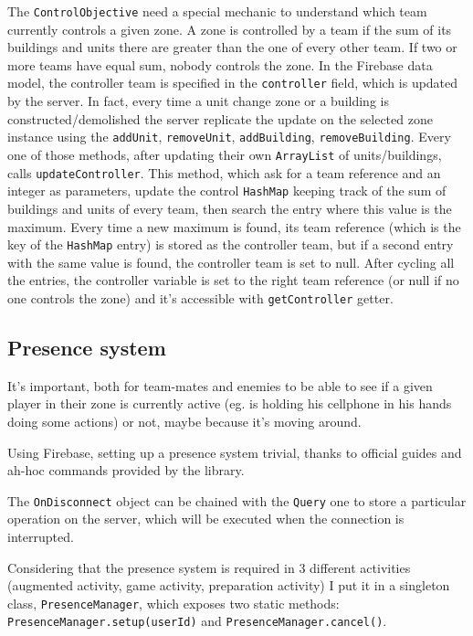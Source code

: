 			The \lstinline|ControlObjective| need a special mechanic to understand which team currently controls a given zone.
			A zone is controlled by a team if the sum of its buildings and units there are greater than the one of every other team.
			If two or more teams have equal sum, nobody controls the zone.
			In the Firebase data model, the controller team is specified in the \lstinline|controller| field, which is updated by the server.
			In fact, every time a unit change zone or a building is constructed/demolished the server replicate the update on the selected zone instance using the \lstinline|addUnit|, \lstinline|removeUnit|, \lstinline|addBuilding|, \lstinline|removeBuilding|.
			Every one of those methods, after updating their own \lstinline|ArrayList| of units/buildings, calls \lstinline|updateController|.
			This method, which ask for a team reference and an integer as parameters, update the control \lstinline|HashMap| keeping track of the sum of buildings and units of every team, then search the entry where this value is the maximum.
			Every time a new maximum is found, its team reference (which is the key of the \lstinline|HashMap| entry) is stored as the controller team, but if a second entry with the same value is found, the controller team is set to null.
			After cycling all the entries, the controller variable is set to the right team reference (or null if no one controls the zone) and it's accessible with \lstinline|getController| getter.
		
		\subsection{Presence system}\label{focus:presence}

			It's important, both for team-mates and enemies to be able to see if a given player in their zone is currently active (eg. is holding his cellphone in his hands doing some actions) or not, maybe because it's moving around.
			
			Using Firebase, setting up a presence system trivial, thanks to official guides\cite{firebase:presence} and ah-hoc commands provided by the library.
			
			The \lstinline|OnDisconnect| object can be chained with the \lstinline|Query| one to store a particular operation on the server, which will be executed when the connection is interrupted.
			
			Considering that the presence system is required in 3 different activities (augmented activity, game activity, preparation activity) I put it in a singleton class, \lstinline|PresenceManager|, which exposes two static methods: \lstinline|PresenceManager.setup(userId)| and \lstinline|PresenceManager.cancel()|.
		 
